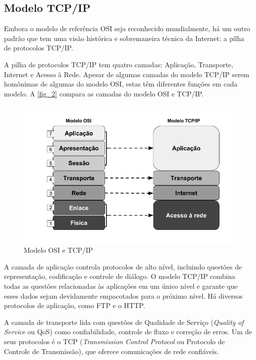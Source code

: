 \documentclass[
12pt,				%
openright,			%
oneside,			%
a4paper,			%
brazil,				%
]{abntex2}
\begin{document}
	
	\subsection{Modelo TCP/IP}
	
	\par Embora o modelo de referência OSI seja reconhecido mundialmente, há um outro padrão que tem uma visão histórica e sobremaneira técnica da Internet: a pilha de protocolos TCP/IP.
	
	\par A pilha de protocolos TCP/IP tem quatro camadas: Aplicação, Transporte, Internet e Acesso à Rede. Apesar de algumas camadas do modelo TCP/IP serem homônimas de algumas do modelo OSI, estas têm diferentes funções em cada modelo. A \autoref{fig_2} compara as camadas do modelo OSI e TCP/IP.
	
	\begin{figure} [H]
		\centering
		\includegraphics[scale=.5]{figuras/cap2/02ModeloOSIeTCP}
		\caption{\label{fig_2}Modelo OSI e TCP/IP}
	\end{figure}
	
	\par A camada de aplicação controla protocolos de alto nível, incluindo questões de representação, codificação e controle de diálogo. O modelo TCP/IP combina todas as questões relacionadas às aplicações em um único nível e garante que esses dados sejam devidamente empacotados para o próximo nível. Há diversos protocolos de aplicação, como FTP e o HTTP.
	
	\par A camada de transporte lida com questões de Qualidade de Serviço (\textit{Quality of Service} ou QoS) como confiabilidade, controle de fluxo e correção de erros. Um de seus protocolos é o TCP (\textit{Transmission Control Protocol} ou Protocolo de Controle de Transmissão), que oferece comunicações de rede confiáveis. 
	
\end{document}
